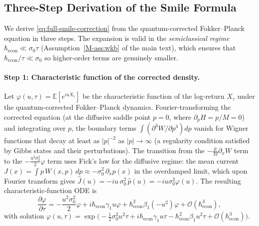 \subsection*{Three-Step Derivation of the Smile Formula}
\label{app:moyal-threestep}

We derive \eqref{eq:full-smile-correction} from the quantum-corrected
Fokker--Planck equation in three steps. The expansion is valid in the
\emph{semiclassical regime} $\hbar_{\mathrm{econ}} \ll \sigma_0 \tau$
(Assumption~\ref{M-ass:wkb} of the main text), which ensures that
$\hbar_{\mathrm{econ}}/ \tau \ll \sigma_0$ so higher-order terms are
genuinely smaller.

\paragraph{Step 1: Characteristic function of the corrected density.}
Let $\varphi(u,\tau) = \mathbb{E}[e^{iuX_\tau}]$ be the characteristic
function of the log-return $X_\tau$ under the quantum-corrected
Fokker--Planck dynamics. Fourier-transforming the corrected equation
(at the diffusive saddle point $p = 0$, where $\partial_p H = p/M = 0$)
and integrating over $p$, the boundary terms $\int (\partial^3 W/\partial p^3) dp$
vanish for Wigner functions that decay at least as $|p|^{-2}$ as
$|p| \to \infty$ (a regularity condition satisfied by Gibbs states and
their perturbations). The transition from the $-\tfrac{p}{M}\partial_x W$ term
to the $-\tfrac{u^2\sigma_0^2}{2}\varphi$ term uses Fick's law for the
diffusive regime: the mean current $J(x) = \int p\,W(x,p)\,dp \approx
-\sigma_0^2\,\partial_x p(x)$ in the overdamped limit, which upon
Fourier transform gives $\hat{J}(u) = -i u\,\sigma_0^2\,\hat{p}(u)
= -iu\sigma_0^2\varphi(u)$. The resulting characteristic-function ODE is
\begin{equation*}
    \frac{\partial \varphi}{\partial \tau}
    = -\frac{u^2 \sigma_0^2}{2}\varphi
    + i\hbar_{\mathrm{econ}} \gamma_1 u \varphi
    + \hbar_{\mathrm{econ}}^2 \beta_1 (-u^2)\varphi
    + \mathcal{O}(\hbar_{\mathrm{econ}}^3),
\end{equation*}
with solution
$\varphi(u,\tau) = \exp\!\bigl(-\tfrac{1}{2}\sigma_0^2 u^2 \tau
+ i\hbar_{\mathrm{econ}}\gamma_1 u \tau
- \hbar_{\mathrm{econ}}^2 \beta_1 u^2 \tau
+ \mathcal{O}(\hbar_{\mathrm{econ}}^3)\bigr)$.

